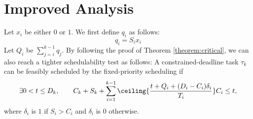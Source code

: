 \section{Improved Analysis}

Let $x_i$ be either $0$ or $1$. We first define $q_i$ as follows:
\begin{equation}
  \label{eq:qi}
  q_i = S_i x_i
\end{equation}
Let $Q_i$ be $\sum_{j=i}^{k-1} q_j$.  
By following the proof of Theorem \ref{theorem:critical}, we can also reach a tighter schedulability test as follows: A constrained-deadline task $\tau_k$ can be feasibly scheduled by the fixed-priority scheduling if
\begin{equation} \label{eq:TDA-suspension-tighter} 
\exists 0 < t \leq D_k, \qquad C_k+S_k+ \sum_{i=1}^{k-1}\ceiling{\frac{t+Q_i+(D_i-C_i)\delta_i}{T_i}} C_i \leq t,
\end{equation}
where $\delta_i$ is $1$ if $S_i > C_i$ and $\delta_i$ is $0$ otherwise.
  
  
  
  
  
  
  
  
  
  
  
  
  
  